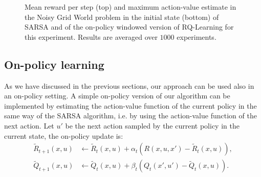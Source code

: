 \begin{figure}[t]
\begin{minipage}{\columnwidth}
\end{minipage}
  \caption[Grid world with holes algorithms comparison - 2]{Mean reward per step (top) and maximum action-value estimate in the Noisy Grid World problem in the initial state (bottom) of SARSA and of the on-policy windowed version of RQ-Learning for this experiment. Results are averaged over $1000$ experiments.}
  \label{F:sarsa}
\end{figure}

\subsection{On-policy learning}
As we have discussed in the previous sections, our approach can be used also in an on-policy setting. A simple on-policy version of our algorithm can be implemented by estimating the action-value function of the current policy in the same way of the SARSA algorithm, i.e. by using the action-value function of the next action. Let $u'$ be the next action sampled by the current policy in the current state, the on-policy update is:
\begin{align*}
\tilde{R}_{t+1}(x,u) & \leftarrow\tilde{R}_t(x,u)+\alpha_t(R(x,u,x')-\tilde{R}_t(x,u)),\\
\tilde{Q}_{t+1}(x,u) & \leftarrow\tilde{Q}_t(x,u)+\beta_t(Q_t(x',u')-\tilde{Q}_t(x,u)).
\end{align*}

